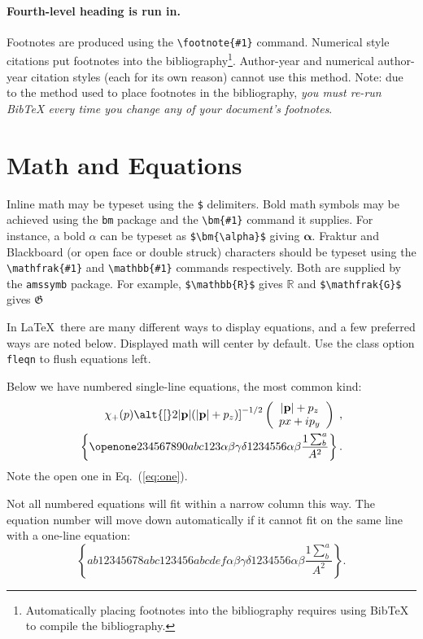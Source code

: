 \documentclass[%
 aip,
 jmp,%
 amsmath,amssymb,
 reprint,%
]{revtex4-1}
\begin{document}
\paragraph{Fourth-level heading is run in.}%
Footnotes are produced using the \verb+\footnote{#1}+ command. 
Numerical style citations put footnotes into the 
bibliography\footnote{Automatically placing footnotes into the bibliography requires using BibTeX to compile the bibliography.}.
Author-year and numerical author-year citation styles (each for its own reason) cannot use this method. 
Note: due to the method used to place footnotes in the bibliography, \emph{you
must re-run BibTeX every time you change any of your document's
footnotes}. 

\section{Math and Equations}
Inline math may be typeset using the \verb+$+ delimiters. Bold math
symbols may be achieved using the \verb+bm+ package and the
\verb+\bm{#1}+ command it supplies. For instance, a bold $\alpha$ can
be typeset as \verb+$\bm{\alpha}$+ giving $\bm{\alpha}$. Fraktur and
Blackboard (or open face or double struck) characters should be
typeset using the \verb+\mathfrak{#1}+ and \verb+\mathbb{#1}+ commands
respectively. Both are supplied by the \texttt{amssymb} package. For
example, \verb+$\mathbb{R}$+ gives $\mathbb{R}$ and
\verb+$\mathfrak{G}$+ gives $\mathfrak{G}$

In \LaTeX\ there are many different ways to display equations, and a
few preferred ways are noted below. Displayed math will center by
default. Use the class option \verb+fleqn+ to flush equations left.

Below we have numbered single-line equations, the most common kind: 
\begin{eqnarray}
\chi_+(p)\alt{\bf [}2|{\bf p}|(|{\bf p}|+p_z){\bf ]}^{-1/2}
\left(
\begin{array}{c}
|{\bf p}|+p_z\\
px+ip_y
\end{array}\right)\;,
\\
\left\{%
 \openone234567890abc123\alpha\beta\gamma\delta1234556\alpha\beta
 \frac{1\sum^{a}_{b}}{A^2}%
\right\}%
\label{eq:one}.
\end{eqnarray}
Note the open one in Eq.~(\ref{eq:one}).

Not all numbered equations will fit within a narrow column this
way. The equation number will move down automatically if it cannot fit
on the same line with a one-line equation:
\begin{equation}
\left\{
 ab12345678abc123456abcdef\alpha\beta\gamma\delta1234556\alpha\beta
 \frac{1\sum^{a}_{b}}{A^2}%
\right\}.
\end{equation}
\end{document}
